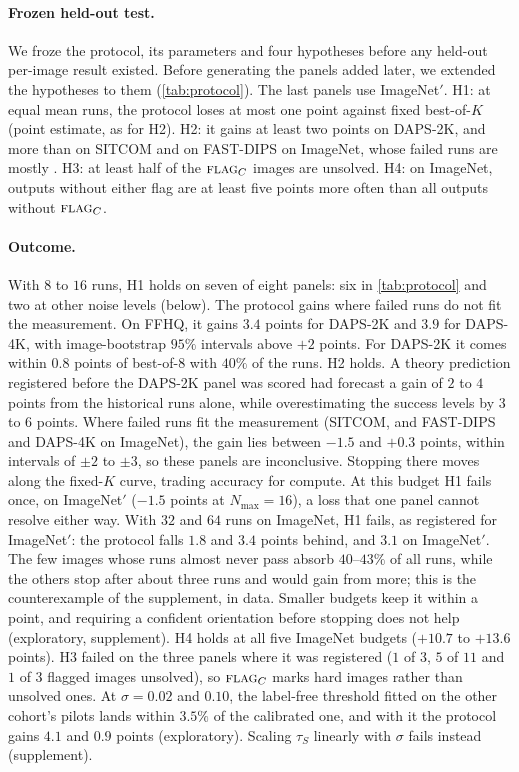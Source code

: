 \paragraph{Frozen held-out test.}
We froze the protocol, its parameters and four hypotheses before any held-out per-image result existed.
Before generating the panels added later, we extended the hypotheses to them (\cref{tab:protocol}).
The last panels use ImageNet$'$.
H1: at equal mean runs, the protocol loses at most one point against fixed best-of-$K$ (point estimate, as for H2).
H2: it gains at least two points on DAPS-2K, and more than on SITCOM and on FAST-DIPS on ImageNet, whose failed runs are mostly \cons.
H3: at least half of the $\textsc{flag}_C$ images are unsolved.
H4: on ImageNet, outputs without either flag are \good at least five points more often than all outputs without $\textsc{flag}_C$.

\paragraph{Outcome.}
With $8$ to $16$ runs, H1 holds on seven of eight panels: six in \cref{tab:protocol} and two at other noise levels (below).
The protocol gains where failed runs do not fit the measurement.
On FFHQ, it gains $3.4$ points for DAPS-2K and $3.9$ for DAPS-4K, with image-bootstrap $95\%$ intervals above $+2$ points.
For DAPS-2K it comes within $0.8$ points of best-of-$8$ with $40\%$ of the runs.
H2 holds.
A theory prediction registered before the DAPS-2K panel was scored had forecast a gain of $2$ to $4$ points from the historical runs alone, while overestimating the success levels by $3$ to $6$ points.
Where failed runs fit the measurement (SITCOM, and FAST-DIPS and DAPS-4K on ImageNet), the gain lies between $-1.5$ and $+0.3$ points, within intervals of $\pm2$ to $\pm3$, so these panels are inconclusive.
Stopping there moves along the fixed-$K$ curve, trading accuracy for compute.
At this budget H1 fails once, on ImageNet$'$ ($-1.5$ points at $N_{\max}{=}16$), a loss that one panel cannot resolve either way.
With $32$ and $64$ runs on ImageNet, H1 fails, as registered for ImageNet$'$: the protocol falls $1.8$ and $3.4$ points behind, and $3.1$ on ImageNet$'$.
The few images whose runs almost never pass absorb $40$--$43\%$ of all runs, while the others stop after about three runs and would gain from more; this is the counterexample of the supplement, in data.
Smaller budgets keep it within a point, and requiring a confident orientation before stopping does not help (exploratory, supplement).
H4 holds at all five ImageNet budgets ($+10.7$ to $+13.6$ points).
H3 failed on the three panels where it was registered ($1$ of $3$, $5$ of $11$ and $1$ of $3$ flagged images unsolved), so $\textsc{flag}_C$ marks hard images rather than unsolved ones.
At $\sigma=0.02$ and $0.10$, the label-free threshold fitted on the other cohort's pilots lands within $3.5\%$ of the calibrated one, and with it the protocol gains $4.1$ and $0.9$ points (exploratory).
Scaling $\tau_S$ linearly with $\sigma$ fails instead (supplement).

